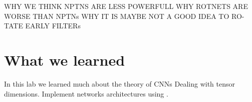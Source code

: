 \documentclass{llncs}
\begin{document}
WHY WE THINK NPTNS ARE LESS POWERFULL WHY ROTNETS ARE
WORSE THAN NPTNs WHY IT IS MAYBE NOT A GOOD IDEA TO RO-
TATE EARLY FILTERs

\section{What we learned}
In this lab we learned much about the theory of CNNs 
Dealing with tensor dimensions.
Implement networks architectures using \pytorch.

%
%

%
%
%
%

\printbibliography

%
\end{document}
